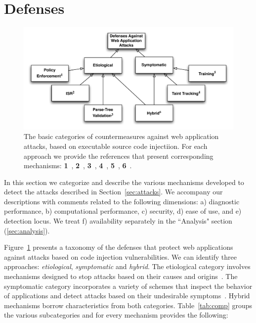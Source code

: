 \documentclass[conference]{IEEEtran}
\begin{document}
\section{Defenses}
\label{sec:defs}

\begin{figure} [ht]
\begin{center}
\leavevmode
\includegraphics[scale=0.65]{defenses.pdf}
\end{center}
\caption{\label{fig:defenses}The basic categories of countermeasures
against web application attacks, based on executable source code
injectiion. For each approach we provide the references
that present corresponding mechanisms:
{\bf 1}~\cite{NSS06,JKK06a,KKVJ06,KJKV09,TNH07,RDWDE07,YCIS07,OWVS08,PSC09,ML10,DDHPJ10,PS11,VDDPJ11,BV08,LV09},
{\bf 2}~\cite{BK04,JB07,GC09,APKLM10},
{\bf 3}~\cite{BWS05,SW06},
{\bf 4}~\cite{HCF05,PB05,XBS06,NLC07,VFJKKV07,PMP11,SLMS14},
{\bf 5}~\cite{LLW02,HO05,HO06,HO05b,VMV05,JEP08,WPLKK09,MS09,MKS09,MKLS11},
{\bf 6}~\cite{BV08,LV09,SMS13}.}
\end{figure}

In this section we categorize and describe the various mechanisms
developed to detect the attacks described in
Section~\ref{sec:attacks}. We accompany our descriptions with comments
related to the following dimensions: a) diagnostic performance, b)
computational performance, c) security, d) ease of use, and e)
detection locus. We treat f) availability separately in the
``Analysis" section (\ref{sec:analysis}).

Figure~\ref{fig:defenses} presents a taxonomy of the
defenses that protect web applications against attacks based on
code injection vulnerabilities.
We can identify three approaches:
{\it etiological}, {\it symptomatic} and {\it hybrid}.
The etiological category involves mechanisms designed to
stop attacks based on their causes and origins~\cite{JL75,L81}. 
The symptomatic category incorporates a variety of schemes that
inspect the behavior of applications and detect attacks based on
their undesirable symptoms~\cite{D76,A00}.
Hybrid mechanisms borrow characteristics from both
categories. Table~\ref{tab:comp} groups the various subcategories and
for every mechanism provides the following:
\end{document}
